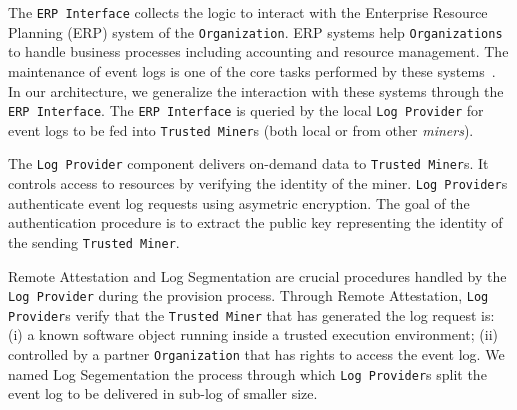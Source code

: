 

The \texttt{ERP Interface} collects the logic to interact with the Enterprise Resource Planning (ERP) system  of the \texttt{Organization}. ERP systems help \texttt{Organizations} to handle business processes including accounting and resource management.
The maintenance of event logs is one of the core tasks performed by these systems~\cite{Dumas.etal/2018:FundamentalsofBPM}. In our architecture, we generalize the interaction with these systems through the \texttt{ERP Interface}. The \texttt{ERP Interface} is queried by the local \texttt{Log Provider} for event logs to be fed into \texttt{Trusted Miner}s (both local or from other \emph{miners}). %








The \texttt{Log Provider} component delivers on-demand data to \texttt{Trusted Miner}s. %
It controls access to resources by verifying the %
identity of the miner. %
%
\texttt{Log Provider}s authenticate event log requests using asymetric encryption. %
The goal of the authentication procedure is to extract the public key representing the identity of the sending \texttt{Trusted Miner}.

Remote Attestation and Log Segmentation are crucial procedures handled by the \texttt{Log Provider} during the provision process. Through Remote Attestation, \texttt{Log Provider}s verify that the \texttt{Trusted Miner} that has generated the log request  is: (i) a known software object running inside a trusted execution environment; (ii) controlled by a partner \texttt{Organization} that has rights to access the event log. We named Log Segementation the process through which \texttt{Log Provider}s split the event log to be delivered in sub-log of smaller size.

